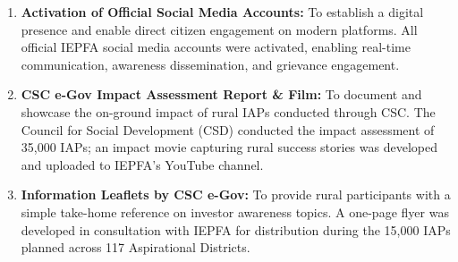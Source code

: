 \documentclass[openany]{book}
\begin{document}
\begin{enumerate}
    \item \textbf{Activation of Official Social Media Accounts:} To establish a digital presence and enable direct citizen engagement on modern platforms. All official IEPFA social media accounts were activated, enabling real-time communication, awareness dissemination, and grievance engagement.
    \item \textbf{CSC e-Gov Impact Assessment Report \& Film:} To document and showcase the on-ground impact of rural IAPs conducted through CSC. The Council for Social Development (CSD) conducted the impact assessment of 35,000 IAPs; an impact movie capturing rural success stories was developed and uploaded to IEPFA's YouTube channel.
    \item \textbf{Information Leaflets by CSC e-Gov:} To provide rural participants with a simple take-home reference on investor awareness topics. A one-page flyer was developed in consultation with IEPFA for distribution during the 15,000 IAPs planned across 117 Aspirational Districts.
\end{enumerate}
\end{document}
